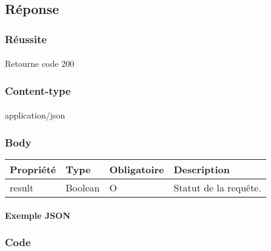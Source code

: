			\paragraph{}
			

\subsection{Réponse}
	\subsubsection{Réussite}
		\paragraph{}
			Retourne code 200
			
	\subsubsection{Content-type}
		\paragraph{}
			application/json
	
	\subsubsection{Body}
		\begin{center}
			\begin{tabularx}{\textwidth}{| T{0.2122\textwidth} | S{0.22\textwidth} | S{0.15\textwidth} | S{0.3\textwidth} |}
				\hline
				Propriété & Type & Obligatoire & Description \\
				\hline
				result & Boolean & O & Statut de la requête. \\
				\hline
			\end{tabularx}
		\end{center}
		
		\vspace{\baselineskip}
		\paragraph{Exemple JSON}
			\paragraph{}
			
			
			
	\subsubsection{Code}
		\paragraph{}
